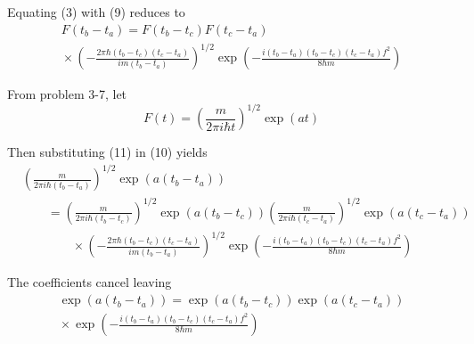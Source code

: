 \documentclass[12pt]{article}
\begin{document}
Equating (3) with (9) reduces to
{\footnotesize
\begin{multline*}
F(t_b-t_a)=F(t_b-t_c)F(t_c-t_a)
\\
{}\times
\left(-\frac{2\pi\hbar(t_b-t_c)(t_c-t_a)}{im(t_b-t_a)}\right)^{1/2}
\exp\left(-\frac{i(t_b-t_a)(t_b-t_c)(t_c-t_a)f^2}{8\hbar m}\right)
\tag{10}
\end{multline*}
}


From problem 3-7, let
\begin{equation*}
F(t)=\left(\frac{m}{2\pi i\hbar t}\right)^{1/2}\exp(at)
\tag{11}
\end{equation*}


Then substituting (11) in (10) yields
{\footnotesize
\begin{align*}
&\left(\frac{m}{2\pi i\hbar(t_b-t_a)}\right)^{1/2}\exp(a(t_b-t_a))
\\
&\qquad{}=\left(\frac{m}{2\pi i\hbar(t_b-t_c)}\right)^{1/2}\exp(a(t_b-t_c))
\left(\frac{m}{2\pi i\hbar(t_c-t_a)}\right)^{1/2}\exp(a(t_c-t_a))
\\
&\qquad\qquad{}\times\left(-\frac{2\pi\hbar(t_b-t_c)(t_c-t_a)}{im(t_b-t_a)}\right)^{1/2}
\exp\left(-\frac{i(t_b-t_a)(t_b-t_c)(t_c-t_a)f^2}{8\hbar m}\right)
\end{align*}
}


The coefficients cancel leaving
\begin{multline*}
\exp(a(t_b-t_a))=\exp(a(t_b-t_c))\exp(a(t_c-t_a))
\\
{}\times
\exp\left(-\frac{i(t_b-t_a)(t_b-t_c)(t_c-t_a)f^2}{8\hbar m}\right)
\end{multline*}
\end{document}
